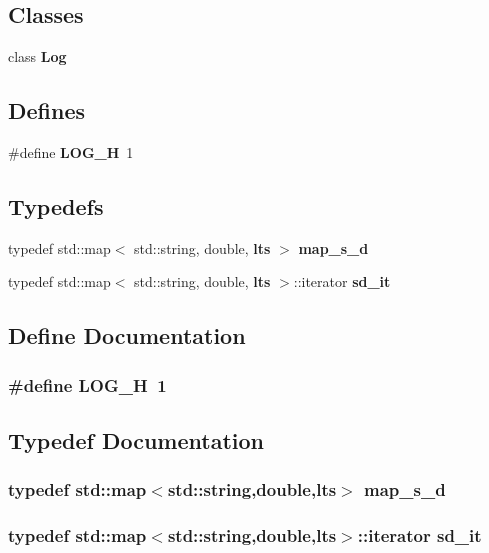 \subsection*{Classes}
\begin{CompactItemize}
\item 
class {\bf Log}
\end{CompactItemize}
\subsection*{Defines}
\begin{CompactItemize}
\item 
\#define {\bf LOG\_\-H}~1
\end{CompactItemize}
\subsection*{Typedefs}
\begin{CompactItemize}
\item 
typedef std::map$<$ std::string, double, {\bf lts} $>$ {\bf map\_\-s\_\-d}
\item 
typedef std::map$<$ std::string, double, {\bf lts} $>$::iterator {\bf sd\_\-it}
\end{CompactItemize}


\subsection{Define Documentation}
\subsubsection{\setlength{\rightskip}{0pt plus 5cm}\#define LOG\_\-H~1}\label{log_8h_234718feb78dab9dbe22c4ec6950efc8}




\subsection{Typedef Documentation}
\subsubsection{\setlength{\rightskip}{0pt plus 5cm}typedef std::map$<$std::string,double,{\bf lts}$>$ {\bf map\_\-s\_\-d}}\label{log_8h_c7be70056f226c85b0a1d973015f047b}


\subsubsection{\setlength{\rightskip}{0pt plus 5cm}typedef std::map$<$std::string,double,{\bf lts}$>$::iterator {\bf sd\_\-it}}\label{log_8h_671ae489b9b4d4580f3cf1904ac57af1}


